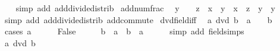 \begin{isabellebody}
%
\isadelimproof
\ \ %
\endisadelimproof
%
\isatagproof
{}\isamarkupfalse%
\ {\isacharparenleft}{\kern0pt}simp\ add{\isacharcolon}{\kern0pt}\ add{\isacharunderscore}{\kern0pt}divide{\isacharunderscore}{\kern0pt}distrib{\isacharparenright}{\kern0pt}%
\endisatagproof
{\isafoldproof}%
%
\isadelimproof
\isanewline
%
\endisadelimproof
\isanewline
{}\isamarkupfalse%
\ add{\isacharunderscore}{\kern0pt}num{\isacharunderscore}{\kern0pt}frac{\isacharcolon}{\kern0pt}\isanewline
\ \ {\isachardoublequoteopen}y\ {\isasymnoteq}\ {}\ {\isasymLongrightarrow}\ z\ {\isacharplus}{\kern0pt}\ x\ {\isacharslash}{\kern0pt}\ y\ {\isacharequal}{\kern0pt}\ {\isacharparenleft}{\kern0pt}x\ {\isacharplus}{\kern0pt}\ z\ {\isacharasterisk}{\kern0pt}\ y{\isacharparenright}{\kern0pt}\ {\isacharslash}{\kern0pt}\ y{\isachardoublequoteclose}\isanewline
%
\isadelimproof
\ \ %
\endisadelimproof
%
\isatagproof
{}\isamarkupfalse%
\ {\isacharparenleft}{\kern0pt}simp\ add{\isacharcolon}{\kern0pt}\ add{\isacharunderscore}{\kern0pt}divide{\isacharunderscore}{\kern0pt}distrib\ add{\isachardot}{\kern0pt}commute{\isacharparenright}{\kern0pt}%
\endisatagproof
{\isafoldproof}%
%
\isadelimproof
\isanewline
%
\endisadelimproof
\isanewline
{}\isamarkupfalse%
\ dvd{\isacharunderscore}{\kern0pt}field{\isacharunderscore}{\kern0pt}iff{\isacharcolon}{\kern0pt}\isanewline
\ \ {\isachardoublequoteopen}a\ dvd\ b\ {\isasymlongleftrightarrow}\ {\isacharparenleft}{\kern0pt}a\ {\isacharequal}{\kern0pt}\ {}\ {\isasymlongrightarrow}\ b\ {\isacharequal}{\kern0pt}\ {}{\isacharparenright}{\kern0pt}{\isachardoublequoteclose}\isanewline
%
\isadelimproof
%
\endisadelimproof
%
\isatagproof
{}\isamarkupfalse%
\ {\isacharparenleft}{\kern0pt}cases\ {\isachardoublequoteopen}a\ {\isacharequal}{\kern0pt}\ {}{\isachardoublequoteclose}{\isacharparenright}{\kern0pt}\isanewline
\ \ \isamarkupfalse%
\ False\isanewline
\ \ \isamarkupfalse%
\ \isamarkupfalse%
\ {\isachardoublequoteopen}b\ {\isacharequal}{\kern0pt}\ a\ {\isacharasterisk}{\kern0pt}\ {\isacharparenleft}{\kern0pt}b\ {\isacharslash}{\kern0pt}\ a{\isacharparenright}{\kern0pt}{\isachardoublequoteclose}\isanewline
\ \ \ \ \isamarkupfalse%
\ {\isacharparenleft}{\kern0pt}simp\ add{\isacharcolon}{\kern0pt}\ field{\isacharunderscore}{\kern0pt}simps{\isacharparenright}{\kern0pt}\isanewline
\ \ \isamarkupfalse%
\ \isamarkupfalse%
\ {\isachardoublequoteopen}a\ dvd\ b{\isachardoublequoteclose}\ \isacommand{{\isachardot}{\kern0pt}{\isachardot}{\kern0pt}}\isamarkupfalse%

\end{isabellebody}
